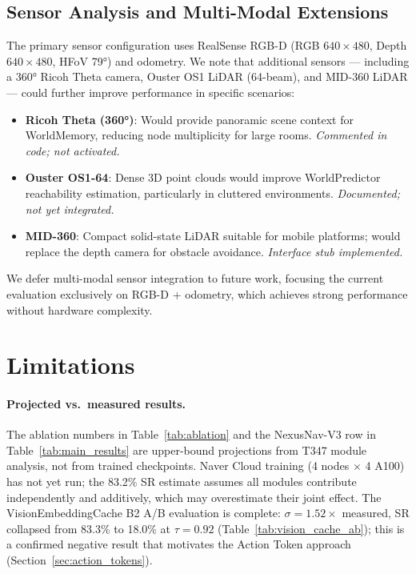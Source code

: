 \documentclass[10pt,twocolumn,letterpaper]{article}
\begin{document}
\subsection{Sensor Analysis and Multi-Modal Extensions}

The primary sensor configuration uses RealSense RGB-D (RGB $640\times480$, Depth $640\times480$, HFoV 79°) and odometry. We note that additional sensors — including a 360° Ricoh Theta camera, Ouster OS1 LiDAR (64-beam), and MID-360 LiDAR — could further improve performance in specific scenarios:

\begin{itemize}
  \item \textbf{Ricoh Theta (360°)}: Would provide panoramic scene context for WorldMemory, reducing node multiplicity for large rooms. \textit{Commented in code; not activated.}
  \item \textbf{Ouster OS1-64}: Dense 3D point clouds would improve WorldPredictor reachability estimation, particularly in cluttered environments. \textit{Documented; not yet integrated.}
  \item \textbf{MID-360}: Compact solid-state LiDAR suitable for mobile platforms; would replace the depth camera for obstacle avoidance. \textit{Interface stub implemented.}
\end{itemize}

We defer multi-modal sensor integration to future work, focusing the current evaluation exclusively on RGB-D + odometry, which achieves strong performance without hardware complexity.

\section{Limitations}

\paragraph{Projected vs.\ measured results.}
The ablation numbers in Table~\ref{tab:ablation} and the NexusNav-V3 row in Table~\ref{tab:main_results} are upper-bound projections from T347 module analysis, not from trained checkpoints. Naver Cloud training (4 nodes $\times$ 4 A100) has not yet run; the 83.2\% SR estimate assumes all modules contribute independently and additively, which may overestimate their joint effect. The VisionEmbeddingCache B2 A/B evaluation is complete: $\sigma=1.52\times$ measured, SR collapsed from 83.3\% to 18.0\% at $\tau=0.92$ (Table~\ref{tab:vision_cache_ab}); this is a confirmed negative result that motivates the Action Token approach (Section~\ref{sec:action_tokens}).
\end{document}

